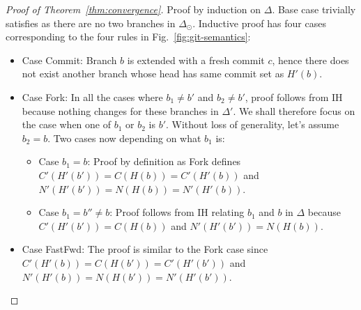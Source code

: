 \begin{proof}[Proof of Theorem~\ref{thm:convergence}]
  Proof by induction on $\Delta$. Base case trivially satisfies as
  there are no two branches in $\Delta_{\odot}$. Inductive proof has
  four cases corresponding to the four rules in
  Fig.~\ref{fig:git-semantics}:
  \begin{itemize}
    \item Case {\sc Commit}: Branch $b$ is extended with a fresh
      commit $c$, hence there does not exist another branch whose head
      has same commit set as $H'(b)$. 

    \item Case {\sc Fork}: In all the cases where $b_1 \neq b'$ and
      $b_2 \neq b'$, proof follows from IH because nothing changes for
      these branches in $\Delta'$. We shall therefore focus on the
      case when one of $b_1$ or $b_2$ is $b'$. Without loss of
      generality, let's assume $b_2 = b$. Two cases now depending on
      what $b_1$ is:
      \begin{itemize}
        \item  Case $b_1 = b$: Proof by definition as {\sc Fork}
          defines $C'(H'(b')) = C(H(b)) = C'(H'(b))$ and $N'(H'(b')) =
          N(H(b)) = N'(H'(b))$. 
        \item Case $b_1 = b'' \neq b$: Proof follows from IH relating
          $b_1$ and $b$ in $\Delta$ because $C'(H'(b')) = C(H(b))$ and $N'(H'(b')) =
          N(H(b))$.
      \end{itemize}

    \item Case {\sc FastFwd}: The proof is similar to the {\sc Fork}
      case since $C'(H'(b)) = C(H(b')) = C'(H'(b'))$ and $N'(H'(b)) =
      N(H(b')) = N'(H'(b'))$.


\end{itemize}
\end{proof}
